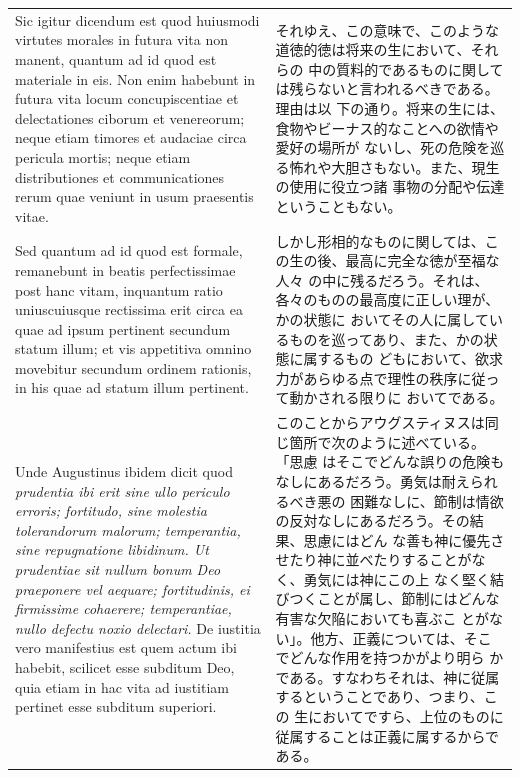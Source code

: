 \documentclass[paper=a4paper,fontsize=10pt,jafontsize=9pt,titlepage]{jlreq}
\begin{document}
\begin{longtable}{p{21em}p{21em}}
 Sic igitur dicendum est quod huiusmodi virtutes morales in futura
 vita non manent, quantum ad id quod est materiale in eis. Non enim
 habebunt in futura vita locum concupiscentiae et delectationes
 ciborum et venereorum; neque etiam timores et audaciae circa pericula
 mortis; neque etiam distributiones et communicationes rerum quae
 veniunt in usum praesentis vitae.
 
&

 それゆえ、この意味で、このような道徳的徳は将来の生において、それらの
 中の質料的であるものに関しては残らないと言われるべきである。理由は以
 下の通り。将来の生には、食物やビーナス的なことへの欲情や愛好の場所が
 ないし、死の危険を巡る怖れや大胆さもない。また、現生の使用に役立つ諸
 事物の分配や伝達ということもない。

\\



 Sed quantum ad id quod est formale, remanebunt in beatis
 perfectissimae post hanc vitam, inquantum ratio uniuscuiusque
 rectissima erit circa ea quae ad ipsum pertinent secundum statum
 illum; et vis appetitiva omnino movebitur secundum ordinem rationis,
 in his quae ad statum illum pertinent.

 &

 しかし形相的なものに関しては、この生の後、最高に完全な徳が至福な人々
 の中に残るだろう。それは、各々のものの最高度に正しい理が、かの状態に
 おいてその人に属しているものを巡ってあり、また、かの状態に属するもの
 どもにおいて、欲求力があらゆる点で理性の秩序に従って動かされる限りに
 おいてである。

\\

 Unde Augustinus ibidem dicit quod {\itshape prudentia ibi erit sine
 ullo periculo erroris; fortitudo, sine molestia tolerandorum malorum;
 temperantia, sine repugnatione libidinum. Ut prudentiae sit nullum
 bonum Deo praeponere vel aequare; fortitudinis, ei firmissime
 cohaerere; temperantiae, nullo defectu noxio delectari.} De iustitia
 vero manifestius est quem actum ibi habebit, scilicet esse subditum
 Deo, quia etiam in hac vita ad iustitiam pertinet esse subditum
 superiori.
 
&

 このことからアウグスティヌスは同じ箇所で次のように述べている。「思慮
 はそこでどんな誤りの危険もなしにあるだろう。勇気は耐えられるべき悪の
 困難なしに、節制は情欲の反対なしにあるだろう。その結果、思慮にはどん
 な善も神に優先させたり神に並べたりすることがなく、勇気には神にこの上
 なく堅く結びつくことが属し、節制にはどんな有害な欠陥においても喜ぶこ
 とがない」。他方、正義については、そこでどんな作用を持つかがより明ら
 かである。すなわちそれは、神に従属するということであり、つまり、この
 生においてですら、上位のものに従属することは正義に属するからである。


\end{longtable}
\end{document}
